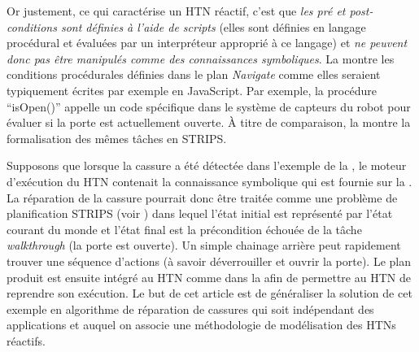 \documentclass[a4paper,twoside,french]{article}
\begin{document}
	
		\par Or justement, ce qui caractérise un HTN réactif, c'est que \emph{les pré et post-conditions sont définies à l'aide de scripts} (elles sont définies en langage procédural et évaluées par un interpréteur approprié à ce langage) et \emph{ne peuvent donc pas être manipulés comme des connaissances symboliques}. La  montre les  conditions procédurales définies dans le plan {\em Navigate} comme elles seraient typiquement écrites par exemple en JavaScript. Par exemple, la procédure ``isOpen()'' appelle un code spécifique dans le système de capteurs du robot pour évaluer si la porte est actuellement ouverte. À titre de comparaison, la  montre la formalisation des mêmes tâches en STRIPS. 
		
		\par Supposons que lorsque la cassure a été détectée dans l'exemple de la , le moteur d'exécution du HTN contenait la connaissance symbolique qui est fournie sur la . La réparation de la cassure pourrait donc être traitée comme une problème de planification STRIPS (voir ) dans lequel l'état initial est représenté par l'état courant du monde et l'état final est la précondition échouée de la tâche {\em walkthrough} (la porte est ouverte). Un simple chainage arrière peut rapidement trouver une séquence d'actions (à savoir déverrouiller et ouvrir la porte). Le plan produit est ensuite intégré au HTN comme dans la  afin de permettre au HTN de reprendre son exécution.  Le but de cet article est de généraliser la solution de cet exemple en algorithme de réparation de cassures qui soit indépendant des applications et auquel on associe une méthodologie de modélisation des HTNs réactifs.
		
\end{document}
